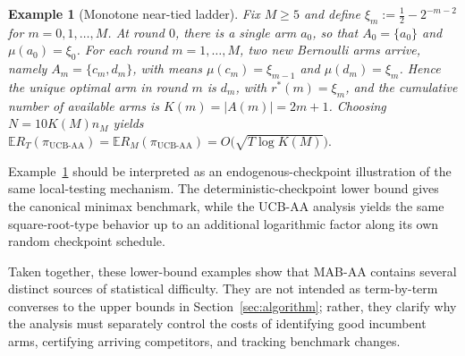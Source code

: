 \documentclass[
  12pt]{article}
\newtheorem{example}{Example}
\begin{document}
\begin{example}[Monotone near-tied ladder]
\label{exp:monotone-near-tied-ladder}
Fix $M\ge 5$ and define $\xi_m := \frac12 - 2^{-m-2}$ for $m=0,1,\dots,M$. At round $0$,
there is a single arm $a_0$, so that $A_0=\{a_0\}$ and $\mu(a_0)=\xi_0$. For each round
$m=1,\dots,M$, two new Bernoulli arms arrive, namely $A_m=\{c_m,d_m\}$, with means
$\mu(c_m)=\xi_{m-1}$ and $\mu(d_m)=\xi_m$. Hence the unique optimal arm in round $m$ is
$d_m$, with $r^*(m)=\xi_m$, and the cumulative number of available arms is
$K(m)=|A(m)|=2m+1$. Choosing $N=10K(M)n_M$ yields
\(
\mathbb E R_T(\pi_{\mathrm{UCB\text{-}AA}})
=
\mathbb E R_M(\pi_{\mathrm{UCB\text{-}AA}})
=
O\bigl(\sqrt{T\log K(M)}\bigr).
\)
\end{example}



Example~\ref{exp:monotone-near-tied-ladder} should be interpreted as an endogenous-checkpoint
illustration of the same local-testing mechanism. The deterministic-checkpoint lower bound gives
the canonical minimax benchmark, while the UCB-AA analysis yields the same square-root-type
behavior up to an additional logarithmic factor along its own random checkpoint schedule.


 

Taken together, these lower-bound examples show that MAB-AA contains several
distinct sources of statistical difficulty. They are not intended as term-by-term
converses to the upper bounds in Section~\ref{sec:algorithm}; rather, they clarify
why the analysis must separately control the costs of identifying good incumbent
arms, certifying arriving competitors, and tracking benchmark changes.
\end{document}
